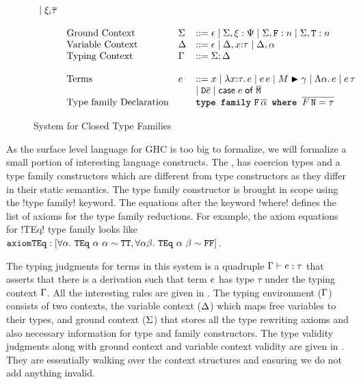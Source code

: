 \documentclass[format=sigplan,manuscript,review,screen,nonacm,margin=1in]{acmart}
\begin{document}
\begin{figure}[ht]
\[\begin{array}{l l l l l}
                                        \mathrel{\mid} \xi_{i}{\overline{\tau}} & \\
      \\
      &\text{Ground Context} &\Sigma   &\mathrel{{:}{:}{=}} \epsilon \mathrel{\mid} \Sigma,\xi_{}{}:\Psi
                                        \mathrel{\mid} \Sigma,\texttt{F}:n \mathrel{\mid} \Sigma,\texttt{T}:n\\
      &\text{Variable Context}&\Delta  &\mathrel{{:}{:}{=}} \epsilon \mathrel{\mid} \Delta,x{:}\tau \mathrel{\mid} \Delta,\alpha\\
      &\text{Typing Context}  &\Gamma  &\mathrel{{:}{:}{=}} \Sigma;\Delta\\
      \\
      &\text{Terms}      & e        &\mathrel{{:}{:}{=}} x \mathrel{\mid} \lambda x{:}\tau.\, e \mathrel{\mid} e\,e \mathrel{\mid}M\mathrel{\blacktriangleright}\gamma 
                                        \mathrel{\mid} \Lambda \alpha.\, e \mathrel{\mid} e\,\tau  \\
      &                  &            & \mathrel{\mid} \texttt{D}\overline{e} \mathrel{\mid} \mathsf{case}\;e\;\mathsf{of}\;\overline{\texttt{M}} \\
      &\text{Type family Declaration} & & \texttt{\textbf{type family}}~
                                          \texttt{F}\,\overline{\alpha}\texttt{\textbf{ where }}
                                          \overline{F\,\texttt{N} = \tau}
    \end{array}
  \]
  \caption[\CLTF{}]{System for Closed Type Families}
  \label{fig:syntax-tf-closed}
\end{figure}
As the surface level language for GHC is too big to formalize, we will formalize a small portion
of interesting language constructs. The \CLTF{}, has coercion types and 
a type family constructors which are different from type constructors as they differ in their
static semantics. The type family constructor is brought in scope using the !type family! keyword.
The equations after the keyword !where! defines the list of axioms for the type family reductions.
For example, the axiom equations for !TEq! type family looks like
$\texttt{axiomTEq}: [\forall\alpha.~{\texttt{TEq}~\alpha~\alpha} \mathrel{\sim} \texttt{TT}, \forall\alpha\beta.~{\texttt{TEq}~\alpha~\beta} \mathrel{\sim} \texttt{FF}]$.



The typing judgments for terms in this system is a quadruple $\Gamma \vdash e : \tau$ that asserts that
there is a derivation such that term $e$ has type $\tau$ under the typing context $\Gamma$. All the interesting
rules are given in . The typing environment ($\Gamma$) consists of two contexts,
the variable context ($\Delta$) which maps free variables to their types, and ground context ($\Sigma$)
that stores all the type rewriting axioms and also necessary information for type and family constructors.
The type validity judgments along with ground context and variable context validity are given in .
They are essentially walking over the context structures and ensuring we do not add anything invalid.
\end{document}
